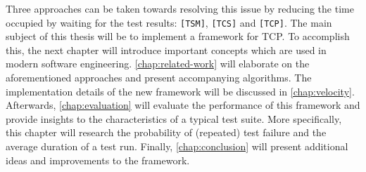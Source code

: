 \noindent Three approaches can be taken towards resolving this issue by reducing the time occupied by waiting for the test results: \tsm{} \texttt{[TSM]}, \tcs{} \texttt{[TCS]} and \tcp{} \texttt{[TCP]}. The main subject of this thesis will be to implement a framework for TCP. To accomplish this, the next chapter will introduce important concepts which are used in modern software engineering. \autoref{chap:related-work} will elaborate on the aforementioned approaches and present accompanying algorithms. The implementation details of the new framework will be discussed in \autoref{chap:velocity}. Afterwards, \autoref{chap:evaluation} will evaluate the performance of this framework and provide insights to the characteristics of a typical test suite. More specifically, this chapter will research the probability of (repeated) test failure and the average duration of a test run. Finally, \autoref{chap:conclusion} will present additional ideas and improvements to the framework.